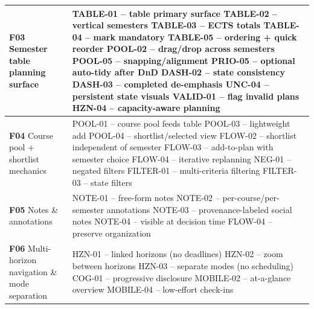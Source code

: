 \begin{longtable}{p{4.5cm} p{10cm}}
\textbf{F03} Semester table planning surface &
TABLE-01 -- table primary surface \newline
TABLE-02 -- vertical semesters \newline
TABLE-03 -- ECTS totals \newline
TABLE-04 -- mark mandatory \newline
TABLE-05 -- ordering + quick reorder \newline
POOL-02 -- drag/drop across semesters \newline
POOL-05 -- snapping/alignment \newline
PRIO-05 -- optional auto-tidy after DnD \newline
DASH-02 -- state consistency \newline
DASH-03 -- completed de-emphasis \newline
UNC-04 -- persistent state visuals \newline
VALID-01 -- flag invalid plans \newline
HZN-04 -- capacity-aware planning \\
\midrule

\textbf{F04} Course pool + shortlist mechanics &
POOL-01 -- course pool feeds table \newline
POOL-03 -- lightweight add \newline
POOL-04 -- shortlist/selected view \newline
FLOW-02 -- shortlist independent of semester \newline
FLOW-03 -- add-to-plan with semester choice \newline
FLOW-04 -- iterative replanning \newline
NEG-01 -- negated filters \newline
FILTER-01 -- multi-criteria filtering \newline
FILTER-03 -- state filters \\
\midrule

\textbf{F05} Notes \& annotations &
NOTE-01 -- free-form notes \newline
NOTE-02 -- per-course/per-semester annotations \newline
NOTE-03 -- provenance-labeled social notes \newline
NOTE-04 -- visible at decision time \newline
FLOW-04 -- preserve organization \\
\midrule

\textbf{F06} Multi-horizon navigation \& mode separation &
HZN-01 -- linked horizons (no deadlines) \newline
HZN-02 -- zoom between horizons \newline
HZN-03 -- separate modes (no scheduling) \newline
COG-01 -- progressive disclosure \newline
MOBILE-02 -- at-a-glance overview \newline
MOBILE-04 -- low-effort check-ins \\
\midrule


\end{longtable}
